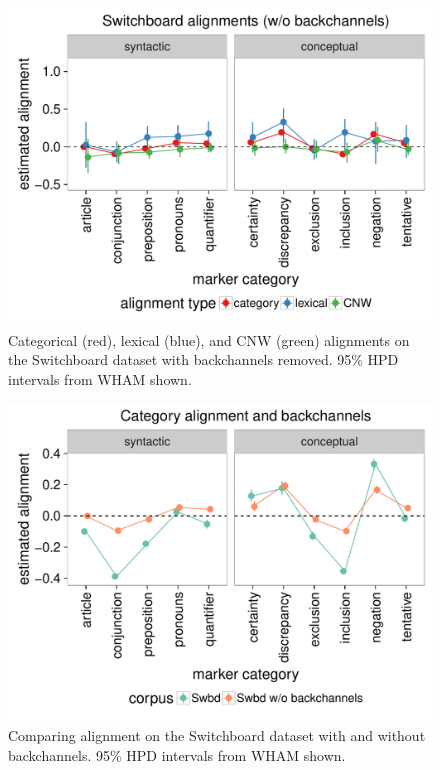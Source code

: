 \documentclass[11pt]{article}
\begin{document}
\begin{figure}[t]
  \begin{center}
    \includegraphics[width=\columnwidth]{results/swbdn_line.pdf}
  \end{center}
  \caption{Categorical (red), lexical (blue), and CNW (green) alignments on the Switchboard dataset with backchannels removed. 95\% HPD intervals from WHAM shown.}\label{fig:swbdn-res}
\end{figure}

\begin{figure}[t]
  \begin{center}
    \includegraphics[width=\columnwidth]{results/swbds_line.pdf}
  \end{center}
  \caption{Comparing alignment on the Switchboard dataset with and without backchannels. 95\% HPD intervals from WHAM shown.}\label{fig:swbds-res}
\end{figure}
\end{document}
